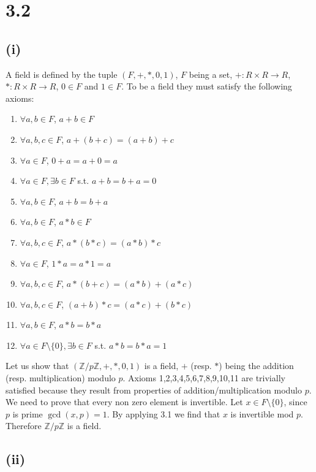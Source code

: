 \documentclass[12pt,a4paper]{article}
\newcommand {\zpz}[1]{\mathbb{Z}/#1\mathbb{Z}}
\begin{document}
\section*{3.2}

\subsection*{(i)}
A field is defined by the tuple $(F,+,*,0,1)$, $F$ being a set, $+:R \times R \rightarrow R$, $*:R \times R \rightarrow R$, $0 \in F$ and $1 \in F$.
To be a field they must satisfy the following axioms:
\begin{enumerate}
    \item $\forall a,b \in F$, $a+b \in F$
    \item $\forall a,b,c \in F$, $a+(b+c) = (a+b)+c$
    \item $\forall a \in F$, $0+a = a+0 = a$
    \item $\forall a \in F, \exists b \in F$ s.t. $a + b = b + a = 0$
    \item $\forall a,b \in F$, $a+b = b+a$
    \item $\forall a,b \in F$, $a*b \in F$
    \item $\forall a,b,c \in F$, $a*(b*c) = (a*b)*c$
    \item $\forall a \in F$, $1*a = a*1 = a$
    \item $\forall a,b,c \in F$, $a*(b+c) = (a*b) + (a*c)$
    \item $\forall a,b,c \in F$, $(a+b)*c = (a*c) + (b*c)$
    \item $\forall a,b \in F$, $a*b = b*a$
    \item $\forall a \in F \setminus\{0\}, \exists b \in F$ s.t. $ a*b = b*a = 1$
\end{enumerate}

Let us show that $(\zpz{p},+,*,0,1)$ is a field, $+$ (resp. $*$) being the addition (resp. multiplication) modulo $p$.
Axioms 1,2,3,4,5,6,7,8,9,10,11 are trivially satisfied because they result from properties of addition/multiplication modulo $p$. We need to prove that every non zero element is invertible. 
Let $x \in F \setminus \{0\}$, since $p$  is prime $\gcd(x,p) = 1$. By applying 3.1 we find that $x$ is invertible mod $p$. 
Therefore $\zpz{p}$ is a field.

\subsection*{(ii)}
\end{document}
